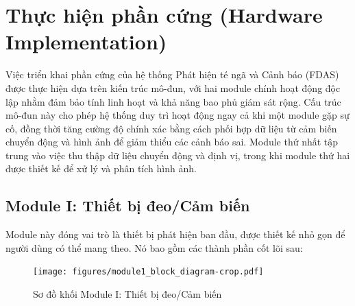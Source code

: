 \section{Thực hiện phần cứng (Hardware Implementation)}
\label{sec:hardware_implementation}

Việc triển khai phần cứng của hệ thống Phát hiện té ngã và Cảnh báo (FDAS) được thực hiện dựa trên kiến trúc mô-đun, với hai module chính hoạt động độc lập nhằm đảm bảo tính linh hoạt và khả năng bao phủ giám sát rộng. Cấu trúc mô-đun này cho phép hệ thống duy trì hoạt động ngay cả khi một module gặp sự cố, đồng thời tăng cường độ chính xác bằng cách phối hợp dữ liệu từ cảm biến chuyển động và hình ảnh để giảm thiểu các cảnh báo sai. Module thứ nhất tập trung vào việc thu thập dữ liệu chuyển động và định vị, trong khi module thứ hai được thiết kế để xử lý và phân tích hình ảnh.

\subsection{Module I: Thiết bị đeo\slash Cảm biến}
\label{ssec:module_one}

Module này đóng vai trò là thiết bị phát hiện ban đầu, được thiết kế nhỏ gọn để người dùng có thể mang theo. Nó bao gồm các thành phần cốt lõi sau:

\begin{figure}[H]
 	\centering
 	\texttt{[image: figures/module1\_block\_diagram-crop.pdf]}
 	\caption{Sơ đồ khối Module I: Thiết bị đeo\slash Cảm biến}
 	\label{fig:module1_block_diagram}
\end{figure}

